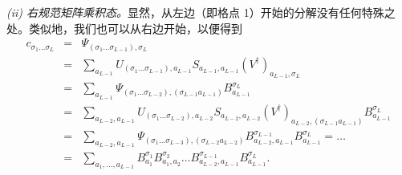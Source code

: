 {\em (ii) 右规范矩阵乘积态。}显然，从左边（即格点 1）开始的分解没有任何特殊之处。类似地，我们也可以从右边开始，以便得到
\begin{eqnarray*}
c_{\sigma_1 \ldots \sigma_L} &=& \Psi_{(\sigma_1 \ldots \sigma_{L-1}), \sigma_L} \\
&=& \sum_{a_{L-1}} U_{(\sigma_1 \ldots \sigma_{L-1}), a_{L-1}} S_{a_{L-1},a_{L-1}} (V^\dagger)_{a_{L-1},\sigma_L} \\
&=& \sum_{a_{L-1}} \Psi_{(\sigma_1 \ldots \sigma_{L-2}),(\sigma_{L-1} a_{L-1})} B^{\sigma_L}_{a_{L-1}} \\
&=& \sum_{a_{L-2}, a_{L-1}} U_{(\sigma_1 \ldots \sigma_{L-2}), a_{L-2}} S_{a_{L-2},a_{L-2}} (V^\dagger)_{a_{L-2},(\sigma_{L-1}a_{L-1})} B^{\sigma_L}_{a_{L-1}} \\
&=& \sum_{a_{L-2}, a_{L-1}} \Psi_{(\sigma_1 \ldots \sigma_{L-3}), (\sigma_{L-2} a_{L-2})} B^{\sigma_{L-1}}_{a_{L-2},a_{L-1}} B^{\sigma_L}_{a_{L-1}} = \ldots \\
&=& \sum_{a_{1},\ldots, a_{L-1}} B^{\sigma_1}_{a_{1}} B^{\sigma_{2}}_{a_{1},a_{2}} \ldots B^{\sigma_{L-1}}_{a_{L-2},a_{L-1}} B^{\sigma_L}_{a_{L-1}}.
\end{eqnarray*}

